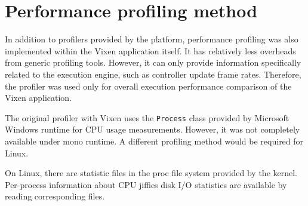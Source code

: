\section{Performance profiling method}

In addition to profilers provided by the platform, performance profiling was also implemented within the Vixen application itself. It has relatively less overheads from generic profiling tools. However, it can only provide information specifically related to the execution engine, such as controller update frame rates. Therefore, the profiler was used only for overall execution performance comparison of the Vixen application.

The original profiler with Vixen uses the \texttt{Process} class provided by Microsoft Windows runtime for CPU usage measurements. However, it was not completely available under mono runtime. A different profiling method would be required for Linux.

On Linux, there are statistic files in the proc file system \cite{proc} provided by the kernel. Per-process information about CPU jiffies  disk I/O statistics are available by reading corresponding files.


